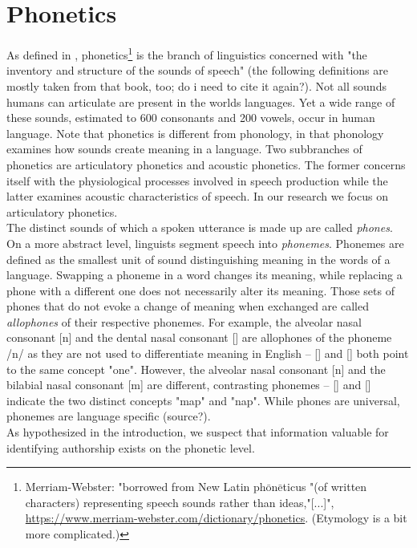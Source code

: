 \section{Phonetics}\label{sec:phonetics}
As defined in \cite{ogrady2017introToLinguistics}, phonetics\footnote{Merriam-Webster: "borrowed from New Latin ph$\bar{\mbox{o}}$n$\bar{\mbox{e}}$ticus "(of written characters) representing speech sounds rather than ideas,"[...]", \url{https://www.merriam-webster.com/dictionary/phonetics}. (Etymology is a bit more complicated.)} is the branch of linguistics concerned with "the inventory and structure of the sounds of speech" (the following definitions are mostly taken from that book, too; do i need to cite it again?).
Not all sounds humans can articulate are present in the worlds languages.
Yet a wide range of these sounds, estimated to 600 consonants and 200 vowels, occur in human language.
Note that phonetics is different from phonology, in that phonology examines how sounds create meaning in a language.
Two subbranches of phonetics are articulatory phonetics and acoustic phonetics.
The former concerns itself with the physiological processes involved in speech production while the latter examines acoustic characteristics of speech.
In our research we focus on articulatory phonetics.\\
The distinct sounds of which a spoken utterance is made up are called \textit{phones}.
On a more abstract level, linguists segment speech into \textit{phonemes}.
Phonemes are defined as the smallest unit of sound distinguishing meaning in the words of a language.
Swapping a phoneme in a word changes its meaning, while replacing a phone with a different one does not necessarily alter its meaning.
Those sets of phones that do not evoke a change of meaning when exchanged are called \textit{allophones} of their respective phonemes.
For example, the alveolar nasal consonant [n] and the dental nasal consonant [\textipa{\|[n}] are allophones of the phoneme /n/ as they are not used to differentiate meaning in English -- [] and [\textipa{w2\|[n}] both point to the same concept "one".
However, the alveolar nasal consonant [n] and the bilabial nasal consonant [m] are different, contrasting phonemes -- [] and [] indicate the two distinct concepts "map" and "nap".
While phones are universal, phonemes are language specific (source?).\\
As hypothesized in the introduction, we suspect that information valuable for identifying authorship exists on the phonetic level.
